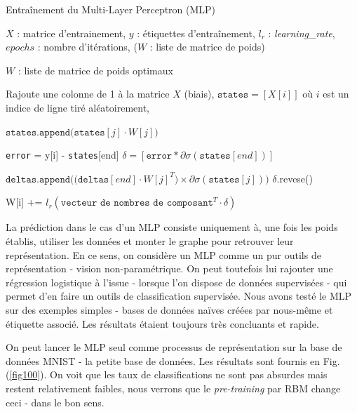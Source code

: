 \documentclass[10pt,a4paper]{article}
\begin{document}
\begin{algorithm}[ht!]
\caption{Entraînement du Multi-Layer Perceptron (MLP)}
\label{algoVince}
\begin{algorithmic}
\Require $X$ : matrice d'entrainement, $y$ : étiquettes d'entraînement, $l_r$ : \emph{learning\_rate}, $epochs$ : nombre d'itérations, ($W$ : liste de matrice de poids)

\Ensure $W$ : liste de matrice de poids optimaux

\State Rajoute une colonne de 1 à la matrice $X$ (biais),
	\State $\texttt{states} = [X[i]]$ où $i$ est un indice de ligne tiré aléatoirement,
	
		\State $\texttt{states.append(states}[j]\cdot W[j])$
	\EndFor
	
	\State \texttt{error} = y[i] - \texttt{states}[end]
	\State $\delta = [\texttt{error}*\partial\sigma(\texttt{states}[end])]$
		
		\State $\texttt{deltas.append((deltas}[end]\cdot W[j]^T) \times \partial \sigma(\texttt{states}[j]))$
	\EndFor
	\State $\delta .$revese()
	
		\State W[i] += $l_r(\texttt{vecteur de nombres de composant}^T\cdot \delta)$
	\EndFor
\EndFor
\end{algorithmic}
\end{algorithm}

La prédiction dans le cas d'un MLP consiste uniquement à, une fois les poids établis, utiliser les données et monter le graphe pour retrouver leur représentation. En ce sens, on considère un MLP comme un pur outils de représentation - vision non-paramétrique. On peut toutefois lui rajouter une régression logistique à l'issue - lorsque l'on dispose de données supervisées - qui permet d'en faire un outils de classification supervisée. Nous avons testé le MLP sur des exemples simples - bases de données naïves créées par nous-même et étiquette associé. Les résultats étaient toujours très concluants et rapide.


On peut lancer le MLP seul comme processus de représentation sur la base de données MNIST - la petite base de données. Les résultats sont fournis en Fig.(\ref{fig100}). On voit que les taux de classifications ne sont pas absurdes mais restent relativement faibles, nous verrons que le \emph{pre-training} par RBM change ceci - dans le bon sens.
\end{document}
